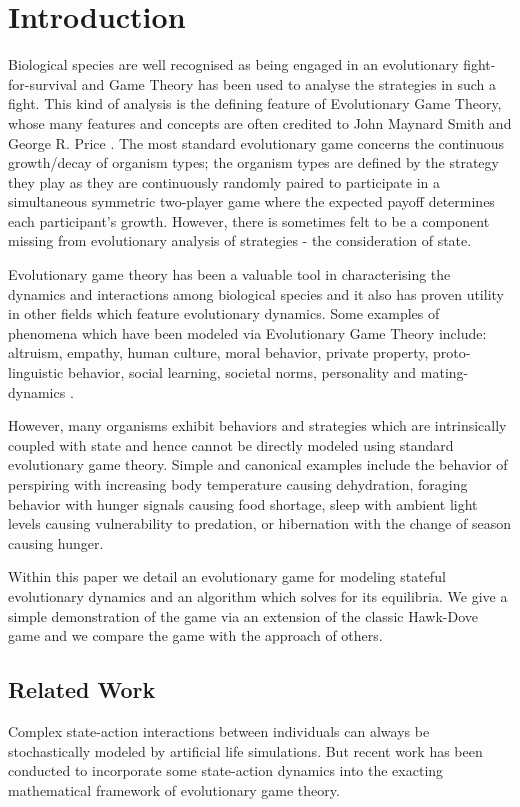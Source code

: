 
\section{Introduction}
Biological species are well recognised as being engaged in an evolutionary fight-for-survival and Game Theory has been used to analyse the strategies in such a fight.
This kind of analysis is the defining feature of Evolutionary Game Theory, whose many features and concepts are often credited to John Maynard Smith and George R. Price \cite{maynard,maynard2}.
The most standard evolutionary game concerns the continuous growth/decay of organism types; the organism types are defined by the strategy they play as they are continuously randomly paired to participate in a simultaneous symmetric two-player game where the expected payoff determines each participant's growth.\cite{weibull}
However, there is sometimes felt to be a component missing from evolutionary analysis of strategies - the consideration of state.\cite{socialpsyc1,errors1}

Evolutionary game theory has been a valuable tool in characterising the dynamics and interactions among biological species and it also has proven utility in other fields which feature evolutionary dynamics.  Some examples of phenomena which have been modeled via Evolutionary Game Theory include: altruism, empathy, human culture, moral behavior, private property, proto-linguistic behavior, social learning, societal norms, personality and mating-dynamics \cite{sep-game-evolutionary,socialpsyc1,Hodgson2012,McNamara953}.

However, many organisms exhibit behaviors and strategies which are intrinsically coupled with state and hence cannot be directly modeled using standard evolutionary game theory.
Simple and canonical examples include the behavior of perspiring with increasing body temperature causing dehydration, foraging behavior with hunger signals causing food shortage, sleep with ambient light levels causing vulnerability to predation, or hibernation with the change of season causing hunger.

Within this paper we detail an evolutionary game for modeling stateful evolutionary dynamics and an algorithm which solves for its equilibria. We give a simple demonstration of the game via an extension of the classic Hawk-Dove game\cite{maynard} and we compare the game with the approach of others.

\subsection{Related Work}
Complex state-action interactions between individuals can always be stochastically modeled by artificial life simulations.\cite{alife1} But recent work has been conducted to incorporate some state-action dynamics into the exacting mathematical framework of evolutionary game theory.

